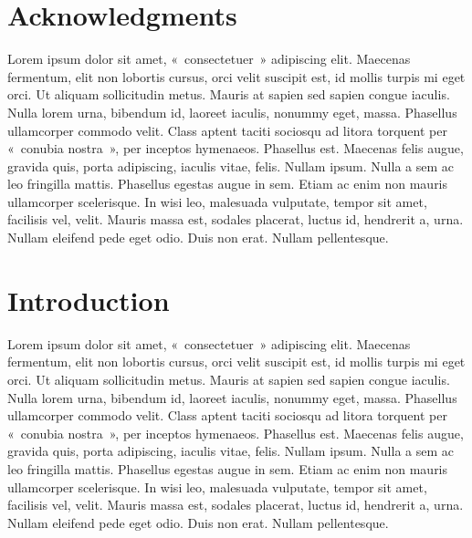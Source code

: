\documentclass[Master of Arts,synopsis]{iitmdiss}
\begin{document}
\begin{doublespacing}

\newpage
\section*{Acknowledgments}
\hrulefill

Lorem ipsum dolor sit amet, «~consectetuer~» adipiscing elit. Maecenas fermentum, elit non lobortis cursus, orci velit suscipit est, id mollis turpis mi eget orci. Ut aliquam sollicitudin metus. Mauris at sapien sed sapien congue iaculis. Nulla lorem urna, bibendum id, laoreet iaculis, nonummy eget, massa. Phasellus ullamcorper commodo velit. Class aptent taciti sociosqu ad litora torquent per «~conubia nostra~», per inceptos hymenaeos. Phasellus est. Maecenas felis augue, gravida quis, porta adipiscing, iaculis vitae, felis. Nullam ipsum. Nulla a sem ac leo fringilla mattis. Phasellus egestas augue in sem. Etiam ac enim non mauris ullamcorper scelerisque. In wisi leo, malesuada vulputate, tempor sit amet, facilisis vel, velit. Mauris massa est, sodales placerat, luctus id, hendrerit a, urna. Nullam eleifend pede eget odio. Duis non erat. Nullam pellentesque.


\newpage
\begin{onehalfspacing}
\tableofcontents
\end{onehalfspacing}
\newpage

\setcounter{page}{1}
\section{Introduction}
\hrulefill


Lorem ipsum dolor sit amet, «~consectetuer~» adipiscing elit. Maecenas fermentum, elit non lobortis cursus, orci velit suscipit est, id mollis turpis mi eget orci. Ut aliquam sollicitudin metus. Mauris at sapien sed sapien congue iaculis. Nulla lorem urna, bibendum id, laoreet iaculis, nonummy eget, massa. Phasellus ullamcorper commodo velit. Class aptent taciti sociosqu ad litora torquent per «~conubia nostra~», per inceptos hymenaeos. Phasellus est. Maecenas felis augue, gravida quis, porta adipiscing, iaculis vitae, felis. Nullam ipsum. Nulla a sem ac leo fringilla mattis. Phasellus egestas augue in sem. Etiam ac enim non mauris ullamcorper scelerisque. In wisi leo, malesuada vulputate, tempor sit amet, facilisis vel, velit. Mauris massa est, sodales placerat, luctus id, hendrerit a, urna. Nullam eleifend pede eget odio. Duis non erat. Nullam pellentesque.
\newpage



\end{doublespacing}
\end{document}
